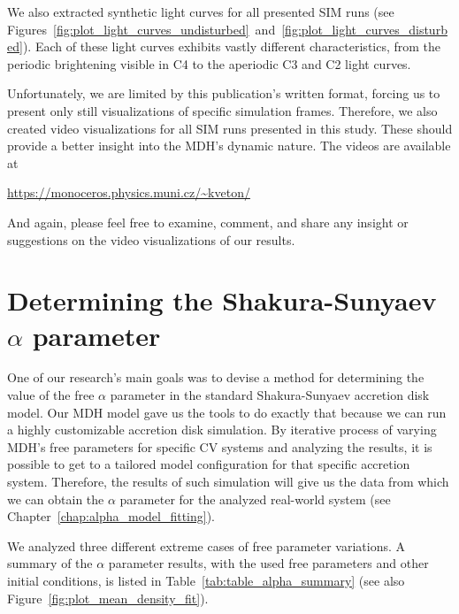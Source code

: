     We also extracted synthetic light curves for all presented SIM runs (see Figures~\ref{fig:plot_light_curves_undisturbed}~and~\ref{fig:plot_light_curves_disturbed}). Each of these light curves exhibits vastly different characteristics, from the periodic brightening visible in C4 to the aperiodic C3 and C2 light curves.  

    Unfortunately, we are limited by this publication's written format, forcing us to present only still visualizations of specific simulation frames. Therefore, we also created video visualizations for all SIM runs presented in this study. These should provide a better insight into the MDH's dynamic nature. The videos are available at

    \begin{center}
        \url{https://monoceros.physics.muni.cz/\~kveton/} 
    \end{center}

    And again, please feel free to examine, comment, and share any insight or suggestions on the video visualizations of our results. 

\section{Determining the Shakura-Sunyaev $\alpha$ parameter}
    One of our research's main goals was to devise a method for determining the value of the free $\alpha$ parameter in the standard Shakura-Sunyaev accretion disk model. Our MDH model gave us the tools to do exactly that because we can run a highly customizable accretion disk simulation. By iterative process of varying MDH's free parameters for specific CV systems and analyzing the results, it is possible to get to a tailored model configuration for that specific accretion system. Therefore, the results of such simulation will give us the data from which we can obtain the $\alpha$ parameter for the analyzed real-world system (see Chapter~\ref{chap:alpha_model_fitting}).

    We analyzed three different extreme cases of free parameter variations. A summary of the $\alpha$ parameter results, with the used free parameters and other initial conditions, is listed in Table~\ref{tab:table_alpha_summary} (see also Figure~\ref{fig:plot_mean_density_fit}).
    
